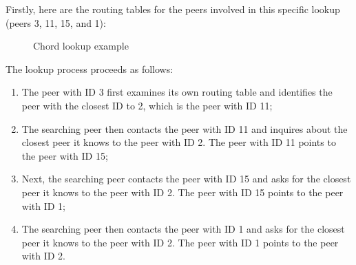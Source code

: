 Firstly, here are the routing tables for the peers involved in this specific lookup (peers 3, 11, 15, and 1):
\begin{figure}[htbp]
    \centering
    \caption{Chord lookup example}
    \label{fig:chord-ring-16-peers-lookup-example}
\end{figure}

The lookup process proceeds as follows:
\begin{enumerate}
    \item The peer with ID 3 first examines its own routing table and identifies the peer with the closest ID to 2, which is the peer with ID 11;
	\item The searching peer then contacts the peer with ID 11 and inquires about the closest peer it knows to the peer with ID 2. The peer with ID 11 points to the peer with ID 15;
	\item Next, the searching peer contacts the peer with ID 15 and asks for the closest peer it knows to the peer with ID 2. The peer with ID 15 points to the peer with ID 1;
	\item The searching peer then contacts the peer with ID 1 and asks for the closest peer it knows to the peer with ID 2. The peer with ID 1 points to the peer with ID 2.
\end{enumerate}

